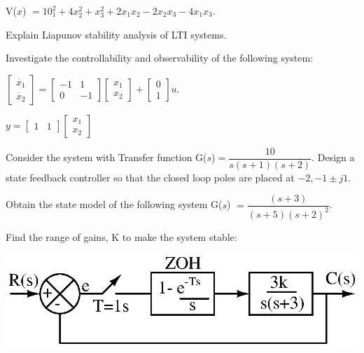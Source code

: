 \hspace{2cm} V($x$) $ = 10^2_1 + 4x_2^2 + x_3^2 + 2x_1x_2 - 2x_2x_3 - 4x_1x_3.$
\item Explain Liapunov stability analysis of LTI systems.

\markB

\newpage \again

\partC

\item  \iitem Investigate the controllability and observability of the following system:

\hspace{1cm}$\begin{bmatrix} \dot{x_1}\\\dot{x_2}\end{bmatrix} = \begin{bmatrix}
  -1 & 1\\
  0 & -1 \end{bmatrix} \begin{bmatrix}
  x_1\\ 
  x_2 \end{bmatrix} + \begin{bmatrix}
  0 \\ 1 \end{bmatrix}
u.$

\hspace{1.6cm}$y = \begin{bmatrix} 1 & 1 \end{bmatrix}
\begin{bmatrix}
  x_1\\ 
  x_2 \end{bmatrix}$
\item Consider the system with Transfer function G($s$)$ = 
  \dfrac{10}{s (s+1) (s+2)}.$ Design a state feedback
  controller so that the closed loop poles are placed at $-2, -1\pm j1.$
\ene
\item \iitem Obtain the state model of the following system G($s$) $
  = \dfrac{(s+3)}{(s+5)(s+2)^2}$.
\Or
\item Find the range of gains, K to make the system stable:

\begin{center}
\includegraphics{src/s6/ai/09_604/fig1}
\end{center}
\ene

